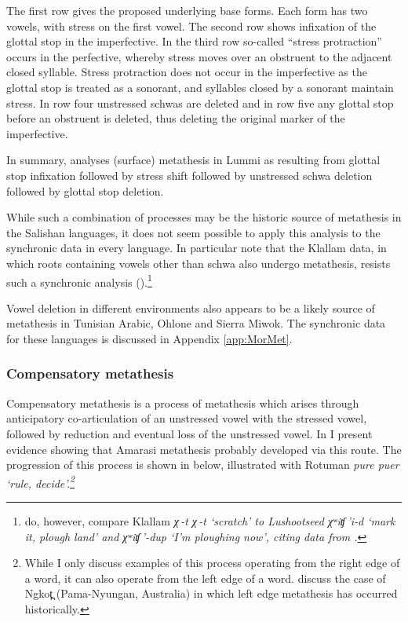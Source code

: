 The first row gives the proposed underlying base forms.
Each form has two vowels, with stress on the first vowel.
The second row shows infixation of the glottal stop in the imperfective.
In the third row so-called ``stress protraction'' occurs in the perfective,
whereby stress moves over an obstruent to the adjacent closed syllable.
Stress protraction does not occur in the imperfective as the glottal stop is treated as a sonorant,
and syllables closed by a sonorant maintain stress.
In row four unstressed schwas are deleted and in row five
any glottal stop before an obstruent is deleted,
thus deleting the original marker of the imperfective.

In summary, \cite{de74} analyses (surface) metathesis in Lummi
as resulting from glottal stop infixation followed by stress shift
followed by unstressed schwa deletion followed by glottal stop deletion.

While such a combination of processes may be the
historic source of metathesis in the Salishan languages,
it does not seem possible to apply this analysis to the synchronic data in every language.
In particular \citet[540]{blga98} note that the Klallam data,
in which roots containing vowels other than schwa also undergo metathesis,
resists such a synchronic analysis ().\footnote{
		\citet[540]{blga98} do, however, compare Klallam
		\it{χ\,-t} {\ra}\it{χ\,-t} `scratch'
		to Lushootseed \it{χʷiʧ\,'i-d} `mark it, plough land' and  \it{χʷiʧ\,'-dup} `I'm ploughing now',
		citing data from \cite{bahehi94}.}
		
Vowel deletion in different environments also appears
to be a likely source of metathesis in Tunisian Arabic, Ohlone and Sierra Miwok.
The synchronic data for these languages is discussed in Appendix \ref{app:MorMet}.

\subsubsection{Compensatory metathesis}\label{sec:ComMet}
Compensatory metathesis is a process %
of metathesis which arises through anticipatory co-articulation
of an unstressed vowel with the stressed vowel, followed by reduction
and eventual loss of the unstressed vowel.
In  I present evidence showing that Amarasi
metathesis probably developed via this route.
The progression of this process is shown in  below,
illustrated with Rotuman \it{pure} {\ra} \it{puer} `rule, decide'.\footnote{
		While I only discuss examples of this process operating from the right edge of a word,
		it can also operate from the left edge of a word.
		\citet[537]{blga98} discuss the case of Ngkot̪ (Pama-Nyungan, Australia)
		in which left edge metathesis has occurred historically.}

